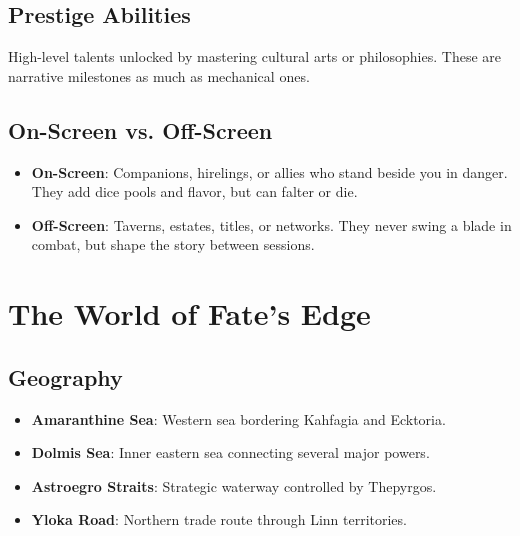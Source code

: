 \documentclass[11pt,twoside]{article}
\begin{document}
\subsection{Prestige Abilities}
High-level talents unlocked by mastering cultural arts or philosophies. These are narrative milestones as much as mechanical ones.

\subsection{On-Screen vs. Off-Screen}
\begin{itemize}[leftmargin=*]
    \item \textbf{On-Screen}: Companions, hirelings, or allies who stand beside you in danger. They add dice pools and flavor, but can falter or die.
    \item \textbf{Off-Screen}: Taverns, estates, titles, or networks. They never swing a blade in combat, but shape the story between sessions.
\end{itemize}

\section{The World of Fate's Edge}

\subsection{Geography}
\begin{itemize}[leftmargin=*]
    \item \textbf{Amaranthine Sea}: Western sea bordering Kahfagia and Ecktoria.
    \item \textbf{Dolmis Sea}: Inner eastern sea connecting several major powers.
    \item \textbf{Astroegro Straits}: Strategic waterway controlled by Thepyrgos.
    \item \textbf{Yloka Road}: Northern trade route through Linn territories.
\end{itemize}
\end{document}
